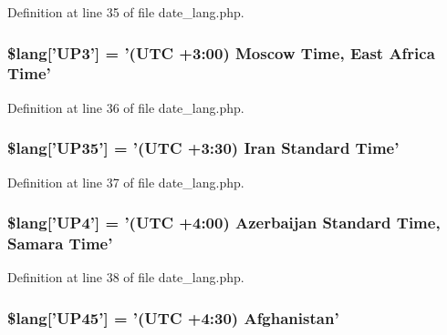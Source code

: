 Definition at line 35 of file date\-\_\-lang.\-php.

\hypertarget{date__lang_8php_a5eddd4b83edcbefcc883077949d40a67}{
\subsubsection[{\$lang}]{\setlength{\rightskip}{0pt plus 5cm}\$lang\mbox{[}'U\-P3'\mbox{]} = '(U\-T\-C +3\-:00) Moscow Time, East Africa Time'}}\label{date__lang_8php_a5eddd4b83edcbefcc883077949d40a67}


Definition at line 36 of file date\-\_\-lang.\-php.

\hypertarget{date__lang_8php_ad669ea69fd450762d029592b6ac64395}{
\subsubsection[{\$lang}]{\setlength{\rightskip}{0pt plus 5cm}\$lang\mbox{[}'U\-P35'\mbox{]} = '(U\-T\-C +3\-:30) Iran Standard Time'}}\label{date__lang_8php_ad669ea69fd450762d029592b6ac64395}


Definition at line 37 of file date\-\_\-lang.\-php.

\hypertarget{date__lang_8php_ad0131a14a1ede9328baf1a1827602f45}{
\subsubsection[{\$lang}]{\setlength{\rightskip}{0pt plus 5cm}\$lang\mbox{[}'U\-P4'\mbox{]} = '(U\-T\-C +4\-:00) Azerbaijan Standard Time, Samara Time'}}\label{date__lang_8php_ad0131a14a1ede9328baf1a1827602f45}


Definition at line 38 of file date\-\_\-lang.\-php.

\hypertarget{date__lang_8php_a7795735f3608127d726a4fca3f87dc79}{
\subsubsection[{\$lang}]{\setlength{\rightskip}{0pt plus 5cm}\$lang\mbox{[}'U\-P45'\mbox{]} = '(U\-T\-C +4\-:30) Afghanistan'}}\label{date__lang_8php_a7795735f3608127d726a4fca3f87dc79}


